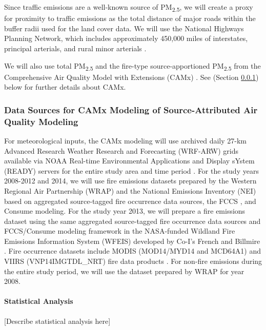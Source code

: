 \documentclass[authoryear]{elsarticle}
\begin{document}
Since traffic emissions are a well-known source of PM\textsubscript{2.5}, we will create a proxy for proximity to traffic emissions as the total distance of major roads within the buffer radii used for the land cover data. We will use the National Highways Planning Network, which includes approximately 450,000 miles of interstates, principal arterials, and rural minor arterials \citep{NHP2017}.

We will also use total PM\textsubscript{2.5} and the fire-type source-apportioned PM\textsubscript{2.5} from the Comprehensive Air Quality Model with Extensions (CAMx) \citep{CAMx2017}. See  (Section \ref{sec:CAMxDataSources}) below for further details about CAMx. 

\subsubsection{Data Sources for CAMx Modeling of Source-Attributed Air Quality Modeling}\label{sec:CAMxDataSources}

For meteorological inputs, the CAMx modeling will use archived daily 27-km Advanced Research Weather Research and Forecasting (WRF-ARW) grids available via NOAA Real-time Environmental Applications and Display sYstem (READY) servers for the entire study area and time period \citep{Wang2007,Rolph2017}. For the study years 2008-2012 and 2014, we will use fire emissions datasets prepared by the Western Regional Air Partnership (WRAP) and the National Emissions Inventory (NEI) \citep{EPANEI2017} based on aggregated source-tagged fire occurrence 
data sources, the FCCS \citep{Ottmar2007}, and Consume \citep{Prichard2009}
modeling. For the study year 2013, we will prepare a fire emissions dataset using the same aggregated source-tagged fire occurrence data sources and FCCS/Consume modeling framework in the NASA-funded  Wildland Fire Emissions Information System (WFEIS) \citep{WFEIS2017} developed by Co-I's French and Billmire \citep{French2014}. Fire occurrence datasets include MODIS  (MOD14/MYD14 and MCD64A1) and  VIIRS (VNP14IMGTDL\_NRT) fire data products \citep{Giglio2006,MODISBurnArea,Schroeder2014}. %
For non-fire emissions during the entire study period, we will use the dataset prepared by WRAP for year 2008.

\paragraph{Statistical Analysis} [Describe statistical analysis here]
\end{document}
